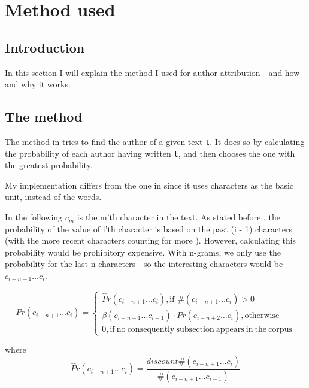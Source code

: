 \section{Method used}
\label{method}

\subsection{Introduction}
In this section I will explain the method I used for author attribution - and how and why it works.

\subsection{The method}
The method in \cite{nr4} tries to find the author of a given text \texttt{t}. It does so by calculating the probability of each author having written \texttt{t}, and then chooses the one with the greatest probability.

My implementation differs from the one in \cite{nr4} since it uses characters as the basic unit, instead of the words.

In the following $c_m$ is the m'th character in the text. As stated before , the probability of the value of i'th character is based on the past (i - 1) characters (with the more recent characters counting for more ). However, calculating this probability would be prohibitory expensive. With n-grams, we only use the probability for the last n characters - so the interesting characters would be $c_{i - n + 1} \ldots c_{i}$.

\begin{equation}
\label{eq:probNorm}
Pr(c_{i - n + 1} \ldots c_{i}) = \left\{
\begin{array}{rl}
\hat{P}r(c_{i - n + 1} \ldots c_{i}), \text{if } \#(c_{i - n + 1} \ldots c_{i}) > 0\\
\beta(c_{i - n + 1} \ldots c_{i-1}) \cdot Pr(c_{i - n + 2} \ldots c_{i}), \mathrm{otherwise}\\
0, \mathrm{if\ no\ consequently\ subsection\ appears\ in\ the\ corpus}
\end{array} \right.
\end{equation}

where 
\begin{equation}
\label{eq:probHat}
\hat{P}r(c_{i - n + 1} \ldots c_{i}) = \frac{discount \#(c_{i - n + 1} \ldots c_{i})}{\#(c_{i - n + 1} \ldots c_{i-1})}
\end{equation}

